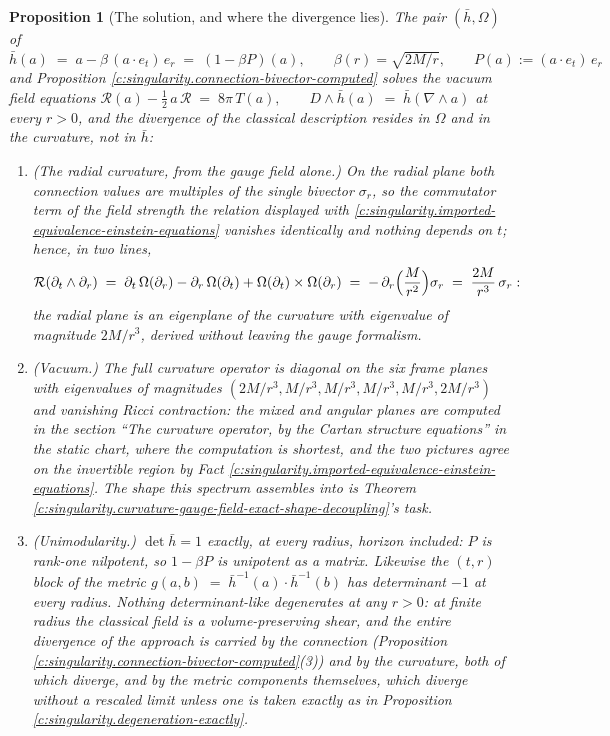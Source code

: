 \documentclass[11pt]{article}
\newtheorem{proposition}[theorem]{Proposition}
\theoremstyle{definition}
\theoremstyle{plain}
\providecommand{\er}{}\renewcommand{\er}{e_r}
\providecommand{\et}{}\renewcommand{\et}{e_t}
\providecommand{\hb}{}\renewcommand{\hb}{\bar{h}}
\begin{document}
\begin{proposition}[The solution, and where the divergence lies]\label{c:singularity.solution-where-divergence-lies}
The pair $(\hb, \Omega)$ of $\hb(a) \;=\; a - \beta\,(a \cdot \et)\,\er \;=\; (1 - \beta P)(a), \qquad \beta(r) = \sqrt{2M/r}, \qquad P(a) := (a \cdot \et)\,\er$ and Proposition \ref{c:singularity.connection-bivector-computed} solves the vacuum field equations $\mathcal{R}(a) - \tfrac12\, a\, \mathcal{R} \;=\; 8\pi\, T(a), \qquad D \wedge \hb(a) \;=\; \hb(\nabla \wedge a)$ at every $r > 0$, and the divergence of the classical description resides in $\Omega$ and in the curvature, not in $\hb$:
\begin{enumerate}
\item (The radial curvature, from the gauge field alone.) On the radial plane both connection values are multiples of the single bivector $\sigma_r$, so the commutator term of the field strength the relation displayed with \ref{c:singularity.imported-equivalence-einstein-equations} vanishes identically and nothing depends on $t$; hence, in two lines,
\[
\mathcal{R}(\partial_t \wedge \partial_r)
\;=\; \partial_t\,\Omega(\partial_r) - \partial_r\,\Omega(\partial_t) + \Omega(\partial_t)\times\Omega(\partial_r)
\;=\; -\,\partial_r\Bigl(\frac{M}{r^2}\Bigr)\sigma_r
\;=\; \frac{2M}{r^3}\,\sigma_r :
\]
the radial plane is an eigenplane of the curvature with eigenvalue of magnitude $2M/r^3$, derived without leaving the gauge formalism.
\item (Vacuum.) The full curvature operator is diagonal on the six frame planes with eigenvalues of magnitudes $(2M/r^3, M/r^3, M/r^3, M/r^3, M/r^3, 2M/r^3)$ and vanishing Ricci contraction: the mixed and angular planes are computed in the section ``The curvature operator, by the Cartan structure equations'' in the static chart, where the computation is shortest, and the two pictures agree on the invertible region by Fact \ref{c:singularity.imported-equivalence-einstein-equations}. The shape this spectrum assembles into is Theorem \ref{c:singularity.curvature-gauge-field-exact-shape-decoupling}'s task.
\item (Unimodularity.) $\det \hb = 1$ exactly, at every radius, horizon included: $P$ is rank-one nilpotent, so $1 - \beta P$ is unipotent as a matrix. Likewise the $(t,r)$ block of the metric $g(a,b) \;=\; \hb^{-1}(a) \cdot \hb^{-1}(b)$ has determinant $-1$ at every radius. Nothing determinant-like degenerates at any $r > 0$: at finite radius the classical field is a volume-preserving shear, and the entire divergence of the approach is carried by the connection (Proposition \ref{c:singularity.connection-bivector-computed}(3)) and by the curvature, both of which diverge, and by the metric components themselves, which diverge without a rescaled limit unless one is taken exactly as in Proposition \ref{c:singularity.degeneration-exactly}.
\end{enumerate}
\end{proposition}
\end{document}
